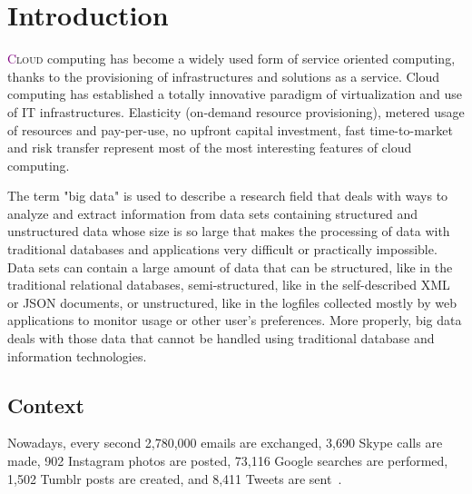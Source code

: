 \chapter{Introduction} \label{chap:Introduction}

\lettrine[lines=4]{\textcolor{purple}{C}}{loud} computing has become a widely used form of service oriented computing, thanks to the provisioning of infrastructures and solutions as a service. Cloud computing has established a totally innovative paradigm of virtualization and use of IT infrastructures. Elasticity (on-demand resource provisioning), metered usage of resources and pay-per-use, no upfront capital investment, fast time-to-market and risk transfer represent most of the most interesting features of cloud computing.

The term "big data" is used to describe a research field that deals with ways to analyze and extract information from data sets containing structured and unstructured data whose size is so large that makes the processing of data with traditional databases and applications very difficult or practically impossible. Data sets can contain a large amount of data that can be structured, like in the traditional relational databases, semi-structured, like in the self-described XML or JSON documents, or unstructured, like in the logfiles collected mostly by web applications to monitor usage or other user's preferences. More properly, big data deals with those data that cannot be handled using traditional database and information technologies. 

\section{Context}\label{sec:context}
Nowadays, every second 2,780,000 emails are exchanged, 3,690 Skype calls are made, 902 Instagram photos are posted, 73,116 Google searches are performed, 1,502 Tumblr posts are created, and 8,411 Tweets are sent~\cite{misc:InternetLiveStats}. 

